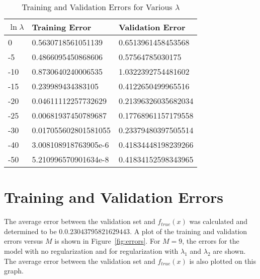 \documentclass[12pt]{article}
\begin{document}
\begin{table}[htp]
    \centering
    \begin{tabular}{|l|l|l|}
    \hline
    $\ln \lambda$ & Training Error       & Validation Error    \\ \hline
    0             & 0.5630718561051139   & 0.6513961458453568  \\ \hline
    -5            & 0.4866095450868606   & 0.57564785030175 \\ \hline
    -10           & 0.8730640240006535   & 1.0322392754481602  \\ \hline
    -15           & 0.239989434383105    & 0.4122650499965516  \\ \hline
    -20           & 0.04611112257732629  & 0.21396326035682034 \\ \hline
    -25           & 0.00681937450789687  & 0.17768961157179558 \\ \hline
    -30           & 0.017055602801581055 & 0.23379480397505514  \\ \hline
    -40           & 3.008108918763905e-6 & 0.41834448198239266  \\ \hline
    -50           & 5.210996570901634e-8 & 0.41834152598343965   \\ \hline
    \end{tabular}
\caption{Training and Validation Errors for Various $\lambda$}
\label{tab:reg_errors}
\end{table}

\section*{Training and Validation Errors}
The average error between the validation set and $f_{true}(x)$ was calculated and determined to be $0.0.23043795821629443$. A plot of the training and validation errors versus $M$ is shown in Figure~\ref{fig:errors}. For $M = 9$, the errors for the model with no regularization and for regularization with $\lambda_1$ and $\lambda_2$ are shown. The average error between the validation set and $f_{true}(x)$ is also plotted on this graph.

\clearpage













\end{document}
